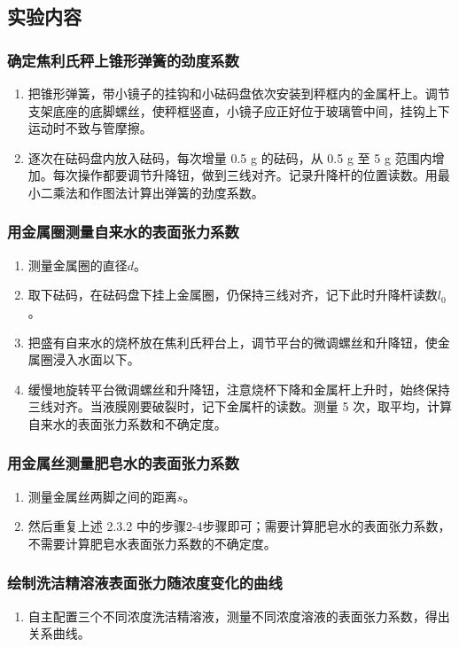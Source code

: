 \documentclass[a4paper]{extarticle}
\begin{document}
    \subsection{实验内容}
    \subsubsection{确定焦利氏秤上锥形弹簧的劲度系数}
    \begin{enumerate}
        \item 把锥形弹簧，带小镜子的挂钩和小砝码盘依次安装到秤框内的金属杆上。调节支架底座的底脚螺丝，使秤框竖直，小镜子应正好位于玻璃管中间，挂钩上下运动时不致与管摩擦。
        \item 逐次在砝码盘内放入砝码，每次增量 0.5 g 的砝码，从 0.5 g 至 5 g 范围内增加。每次操作都要调节升降钮，做到三线对齐。记录升降杆的位置读数。用最小二乘法和作图法计算出弹簧的劲度系数。
    \end{enumerate}
    \subsubsection{用金属圈测量自来水的表面张力系数}
    \begin{enumerate}
        \item 测量金属圈的直径$d$。
        \item 取下砝码，在砝码盘下挂上金属圈，仍保持三线对齐，记下此时升降杆读数$l_0$。
        \item 把盛有自来水的烧杯放在焦利氏秤台上，调节平台的微调螺丝和升降钮，使金属圈浸入水面以下。
        \item 缓慢地旋转平台微调螺丝和升降钮，注意烧杯下降和金属杆上升时，始终保持三线对齐。当液膜刚要破裂时，记下金属杆的读数。测量 5 次，取平均，计算自来水的表面张力系数和不确定度。
    \end{enumerate}
    \subsubsection{用金属丝测量肥皂水的表面张力系数}
    \begin{enumerate}
        \item 测量金属丝两脚之间的距离$s$。
        \item 然后重复上述 2.3.2 中的步骤2-4步骤即可；需要计算肥皂水的表面张力系数，不需要计算肥皂水表面张力系数的不确定度。
    \end{enumerate}
    \subsubsection{绘制洗洁精溶液表面张力随浓度变化的曲线}
    \begin{enumerate}
        \item 自主配置三个不同浓度洗洁精溶液，测量不同浓度溶液的表面张力系数，得出关系曲线。
    \end{enumerate}
\end{document}
